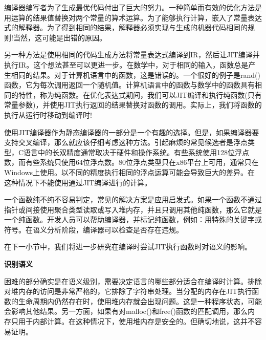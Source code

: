 编译器编写者为了生成最优代码付出了巨大的努力。一种简单而有效的优化方法是用运算的结果值替换对两个常量的算术运算。为了能够执行计算，嵌入了常量表达式的解释器。为了得到相同的结果，解释器必须实现与生成的机器代码相同的规则!当然，这可能是出错的原因。\par

另一种方法是使用相同的代码生成方法将常量表达式编译到IR，然后让JIT编译并执行IR。这个想法甚至可以更进一步。在数学中，对于相同的输入，函数总是产生相同的结果。对于计算机语言中的函数，这是错误的。一个很好的例子是rand()函数，它为每次调用返回一个随机值。计算机语言中的函数与数学中的函数具有相同的特性，称为纯函数。在优化表达式期间，我们可以JIT编译和执行纯函数(只有常量参数)，并使用JIT执行返回的结果替换对函数的调用。实际上，我们将函数的执行从运行时移动到编译时!\par

\begin{tcolorbox}[colback=blue!5!white,colframe=blue!75!black, title=考虑交叉编译]
使用JIT编译器作为静态编译器的一部分是一个有趣的选择。但是，如果编译器要支持交叉编译，那么就应该仔细考虑这种方法。引起麻烦的常见候选者是浮点类型，C语言中的长双精度通常取决于硬件和操作系统。有些系统使用128位浮点数，而有些系统只使用64位浮点数。80位浮点类型只在x86平台上可用，通常只在Windows上使用。以不同的精度执行相同的浮点运算可能会导致巨大的差异。在这种情况下不能使用通过JIT编译进行的计算。
\end{tcolorbox}

一个函数纯不纯不容易判定，常见的解决方案是应用启发式。如果一个函数不通过指针或间接使用聚合类型读取或写入堆内存，并且只调用其他纯函数，那么它就是一个纯函数。开发人员可以帮助编译器，并标记纯函数，例如：用特殊的关键字或符号。在语义分析阶段，编译器可以检查是否存在违规。\par

在下一小节中，我们将进一步研究在编译时尝试JIT执行函数时对语义的影响。\par

\hspace*{\fill} \par %
\textbf{识别语义}

困难的部分确实是在语义级别，需要决定语言的哪些部分适合在编译时计算。排除对堆内存的访问是非常严格的，它排除了字符串处理。当分配的内存在JIT执行函数的生命周期内仍然存在时，使用堆内存就会出现问题。这是一种程序状态，可能会影响其他结果。另一方面，如果有对malloc()和free()函数的匹配调用，那么内存只用于内部计算。在这种情况下，使用堆内存是安全的。但确切地说，这并不容易证明。\par

